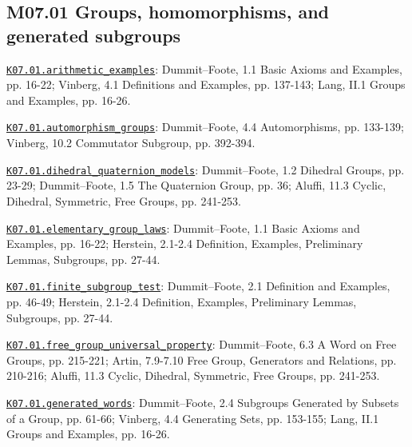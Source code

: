 \subsection*{M07.01 Groups, homomorphisms, and generated subgroups}
\par\smallskip\noindent\hypertarget{src:K07.01.arithmetic_examples}{}\label{src:K07.01.arithmetic_examples}\hyperref[K07.01.arithmetic_examples]{\texttt{K07.01.arithmetic\_examples}}: Dummit--Foote, 1.1 Basic Axioms and Examples, pp. 16-22; Vinberg, 4.1 Definitions and Examples, pp. 137-143; Lang, II.1 Groups and Examples, pp. 16-26.
\par\smallskip\noindent\hypertarget{src:K07.01.automorphism_groups}{}\label{src:K07.01.automorphism_groups}\hyperref[K07.01.automorphism_groups]{\texttt{K07.01.automorphism\_groups}}: Dummit--Foote, 4.4 Automorphisms, pp. 133-139; Vinberg, 10.2 Commutator Subgroup, pp. 392-394.
\par\smallskip\noindent\hypertarget{src:K07.01.dihedral_quaternion_models}{}\label{src:K07.01.dihedral_quaternion_models}\hyperref[K07.01.dihedral_quaternion_models]{\texttt{K07.01.dihedral\_quaternion\_models}}: Dummit--Foote, 1.2 Dihedral Groups, pp. 23-29; Dummit--Foote, 1.5 The Quaternion Group, pp. 36; Aluffi, 11.3 Cyclic, Dihedral, Symmetric, Free Groups, pp. 241-253.
\par\smallskip\noindent\hypertarget{src:K07.01.elementary_group_laws}{}\label{src:K07.01.elementary_group_laws}\hyperref[K07.01.elementary_group_laws]{\texttt{K07.01.elementary\_group\_laws}}: Dummit--Foote, 1.1 Basic Axioms and Examples, pp. 16-22; Herstein, 2.1-2.4 Definition, Examples, Preliminary Lemmas, Subgroups, pp. 27-44.
\par\smallskip\noindent\hypertarget{src:K07.01.finite_subgroup_test}{}\label{src:K07.01.finite_subgroup_test}\hyperref[K07.01.finite_subgroup_test]{\texttt{K07.01.finite\_subgroup\_test}}: Dummit--Foote, 2.1 Definition and Examples, pp. 46-49; Herstein, 2.1-2.4 Definition, Examples, Preliminary Lemmas, Subgroups, pp. 27-44.
\par\smallskip\noindent\hypertarget{src:K07.01.free_group_universal_property}{}\label{src:K07.01.free_group_universal_property}\hyperref[K07.01.free_group_universal_property]{\texttt{K07.01.free\_group\_universal\_property}}: Dummit--Foote, 6.3 A Word on Free Groups, pp. 215-221; Artin, 7.9-7.10 Free Group, Generators and Relations, pp. 210-216; Aluffi, 11.3 Cyclic, Dihedral, Symmetric, Free Groups, pp. 241-253.
\par\smallskip\noindent\hypertarget{src:K07.01.generated_words}{}\label{src:K07.01.generated_words}\hyperref[K07.01.generated_words]{\texttt{K07.01.generated\_words}}: Dummit--Foote, 2.4 Subgroups Generated by Subsets of a Group, pp. 61-66; Vinberg, 4.4 Generating Sets, pp. 153-155; Lang, II.1 Groups and Examples, pp. 16-26.
